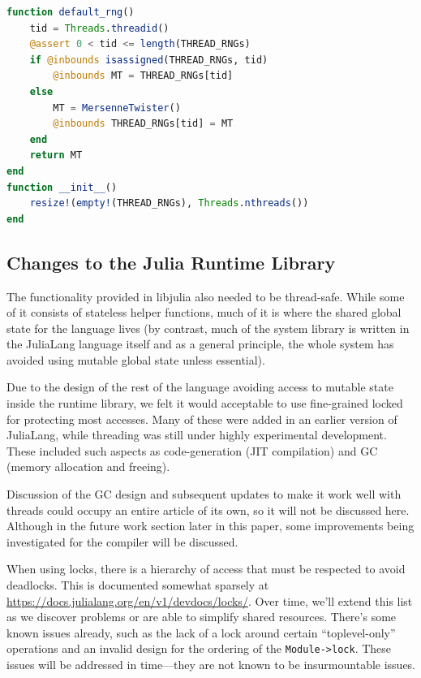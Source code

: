 \documentclass{juliacon}
\begin{document}
\begin{lstlisting}[language = Julia]
function default_rng()
    tid = Threads.threadid()
    @assert 0 < tid <= length(THREAD_RNGs)
    if @inbounds isassigned(THREAD_RNGs, tid)
        @inbounds MT = THREAD_RNGs[tid]
    else
        MT = MersenneTwister()
        @inbounds THREAD_RNGs[tid] = MT
    end
    return MT
end
function __init__()
    resize!(empty!(THREAD_RNGs), Threads.nthreads())
end
\end{lstlisting}


\subsection{Changes to the Julia Runtime Library}
\label{subsub:integration-runtime}

The functionality provided in libjulia also needed to be thread-safe. While some of it consists of stateless helper functions, much of it is where the shared global state for the language lives (by contrast, much of the system library is written in the JuliaLang language itself and as a general principle, the whole system has avoided using mutable global state unless essential).

Due to the design of the rest of the language avoiding access to mutable state inside the runtime library, we felt it would acceptable to use fine-grained locked for protecting most accesses. Many of these were added in an earlier version of JuliaLang, while threading was still under highly experimental development. These included such aspects as code-generation (JIT compilation) and GC (memory allocation and freeing).

Discussion of the GC design and subsequent updates to make it work well with threads could occupy an entire article of its own, so it will not be discussed here. Although in the future work section later in this paper, some improvements being investigated for the compiler will be discussed.

When using locks, there is a hierarchy of access that must be respected to avoid deadlocks. This is documented somewhat sparsely at \url{https://docs.julialang.org/en/v1/devdocs/locks/}. Over time, we'll extend this list as we discover problems or are able to simplify shared resources. There's some known issues already, such as the lack of a lock around certain ``toplevel-only'' operations and an invalid design for the ordering of the \verb|Module->lock|. These issues will be addressed in time—they are not known to be insurmountable issues.
\end{document}
